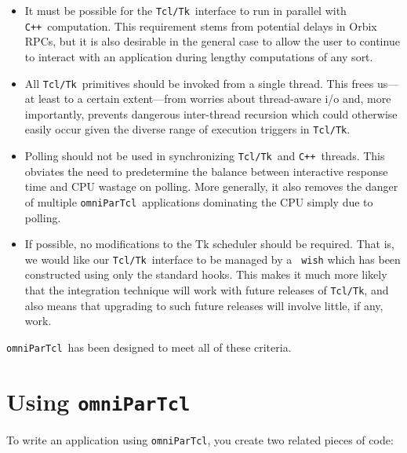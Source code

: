 \documentclass[11pt,twoside,onecolumn]{article}
\def\omniParTcl{{\tt omniParTcl}}
\def\tcltk{{\tt Tcl/Tk}}
\def\CXX{{\tt C++}}
\begin{document}
\begin{itemize}

\item 
It must be possible for the \tcltk\ interface to run in parallel with
\CXX\ computation.  This requirement stems from potential delays in
Orbix RPCs, but it is also desirable in the general case to allow
the user to continue to interact with an application during
lengthy computations of any sort.

\item
All \tcltk\ primitives should be invoked from a single thread.  This
frees us---at least to a certain extent---from worries about
thread-aware i/o and, more importantly, prevents dangerous inter-thread
recursion which could otherwise easily occur given the diverse range of
execution triggers in \tcltk.

\item
Polling should not be used in synchronizing \tcltk\ and \CXX\ 
threads.  This obviates the need to predetermine the balance between
interactive response time and CPU wastage on polling.  More generally,
it also removes the danger of multiple \omniParTcl\ applications
dominating the CPU simply due to polling.

\item 
If possible, no modifications to the Tk scheduler should be required.
That is, we would like our \tcltk\ interface to be managed by a {\tt
wish} which has been constructed using only the standard
hooks.  This makes it much more likely that the integration technique
will work with future releases of \tcltk, and also means that upgrading
to such future releases will involve little, if any, work.

\end{itemize}

\noindent
\omniParTcl\ has been designed to meet all of these criteria.

\section{Using \omniParTcl}

To write an application using \omniParTcl, you create two related pieces
of code:
\end{document}
